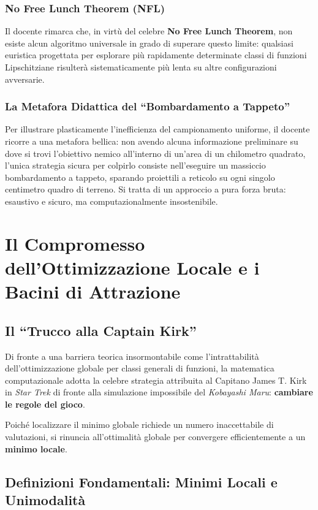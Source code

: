 \subsubsection{No Free Lunch Theorem (NFL)}
Il docente rimarca che, in virt\`u del celebre \textbf{No Free Lunch Theorem}, non esiste alcun algoritmo universale in grado di superare questo limite: qualsiasi euristica progettata per esplorare pi\`u rapidamente determinate classi di funzioni Lipschitziane risulter\`a sistematicamente pi\`u lenta su altre configurazioni avversarie.

\subsubsection{La Metafora Didattica del ``Bombardamento a Tappeto''}
Per illustrare plasticamente l'inefficienza del campionamento uniforme, il docente ricorre a una metafora bellica: non avendo alcuna informazione preliminare su dove si trovi l'obiettivo nemico all'interno di un'area di un chilometro quadrato, l'unica strategia sicura per colpirlo consiste nell'eseguire un massiccio bombardamento a tappeto, sparando proiettili a reticolo su ogni singolo centimetro quadro di terreno. Si tratta di un approccio a pura forza bruta: esaustivo e sicuro, ma computazionalmente insostenibile.

\FloatBarrier
\section{Il Compromesso dell'Ottimizzazione Locale e i Bacini di Attrazione}
\label{sec:univariata-compromesso-locale}

\subsection{Il ``Trucco alla Captain Kirk''}
Di fronte a una barriera teorica insormontabile come l'intrattabilit\`a dell'ottimizzazione globale per classi generali di funzioni, la matematica computazionale adotta la celebre strategia attribuita al Capitano James T. Kirk in \textit{Star Trek} di fronte alla simulazione impossibile del \textit{Kobayashi Maru}: \textbf{cambiare le regole del gioco}.

Poich\'e localizzare il minimo globale richiede un numero inaccettabile di valutazioni, si rinuncia all'ottimalit\`a globale per convergere efficientemente a un \textbf{minimo locale}.

\subsection{Definizioni Fondamentali: Minimi Locali e Unimodalit\`a}

